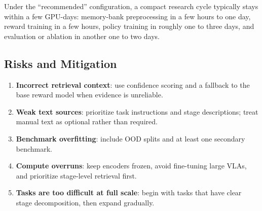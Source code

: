 Under the ``recommended'' configuration, a compact research cycle typically stays within a few GPU-days:
memory-bank preprocessing in a few hours to one day, reward training in a few hours,
policy training in roughly one to three days, and evaluation or ablation in another one to two days.

\subsection{Risks and Mitigation}

\begin{enumerate}
  \item \textbf{Incorrect retrieval context}: use confidence scoring and a fallback to the base reward model when evidence is unreliable.
  \item \textbf{Weak text sources}: prioritize task instructions and stage descriptions; treat manual text as optional rather than required.
  \item \textbf{Benchmark overfitting}: include OOD splits and at least one secondary benchmark.
  \item \textbf{Compute overruns}: keep encoders frozen, avoid fine-tuning large VLAs, and prioritize stage-level retrieval first.
  \item \textbf{Tasks are too difficult at full scale}: begin with tasks that have clear stage decomposition, then expand gradually.
\end{enumerate}
